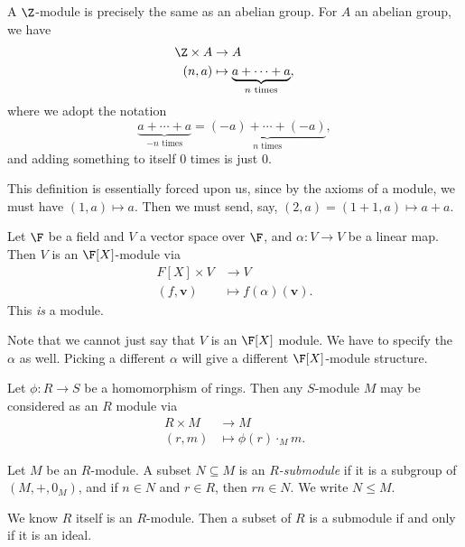 \documentclass[a4paper]{article}
\begin{document}
\begin{eg}
  A $\Z$-module is precisely the same as an abelian group. For $A$ an abelian group, we have
  \begin{align*}
    \Z \times A &\to A\\
    (n, a) &\mapsto \underbrace{a + \cdots + a}_{n\text{ times}},
  \end{align*}
  where we adopt the notation
  \[
    \underbrace{a + \cdots + a}_{-n\text{ times}} = \underbrace{(-a) + \cdots + (-a)}_{n\text{ times}},
  \]
  and adding something to itself $0$ times is just $0$.

  This definition is essentially forced upon us, since by the axioms of a module, we must have $(1, a) \mapsto a$. Then we must send, say, $(2, a) = (1 + 1, a) \mapsto a + a$.
\end{eg}

\begin{eg}
  Let $\F$ be a field and $V$ a vector space over $\F$, and $\alpha: V \to V$ be a linear map. Then $V$ is an $\F[X]$-module via
  \begin{align*}
    F[X] \times V &\to V\\
    (f, \mathbf{v}) & \mapsto f(\alpha) (\mathbf{v}).
  \end{align*}
  This \emph{is} a module.

  Note that we cannot just say that $V$ is an $\F[X]$ module. We have to specify the $\alpha$ as well. Picking a different $\alpha$ will give a different $\F[X]$-module structure.
\end{eg}

\begin{eg}
  Let $\phi: R \to S$ be a homomorphism of rings. Then any $S$-module $M$ may be considered as an $R$ module via
  \begin{align*}
    R\times M &\to M\\
    (r, m) &\mapsto \phi(r) \cdot_M m.
  \end{align*}
\end{eg}

\begin{defi}[Submodule]
  Let $M$ be an $R$-module. A subset $N \subseteq M$ is an \emph{$R$-submodule} if it is a subgroup of $(M, +, 0_M)$, and if $n \in N$ and $r \in R$, then $rn \in N$. We write $N \leq M$.
\end{defi}

\begin{eg}
  We know $R$ itself is an $R$-module. Then a subset of $R$ is a submodule if and only if it is an ideal.
\end{eg}
\end{document}
